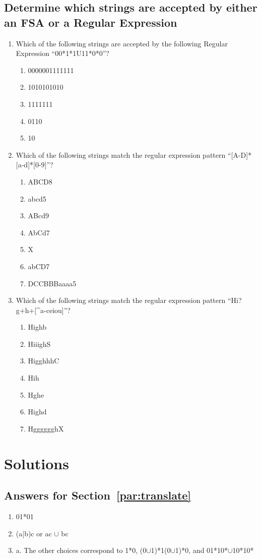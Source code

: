 \documentclass[10pt]{article}
\begin{document}
\subsection{Determine which strings are accepted by either an FSA or a Regular Expression}
\label{par:accepted}
\begin{enumerate}
\item Which of the following strings are accepted by the following Regular Expression     ``00*1*1U11*0*0''?
    \begin{enumerate}
    \item 0000001111111
    \item 1010101010
    \item 1111111
    \item 0110
    \item 10
    \end{enumerate}
\item Which of the following strings match the regular expression
pattern ``[A-D]*[a-d]*[0-9]''?
    \begin{enumerate}
    \item ABCD8
    \item abcd5
    \item ABcd9
    \item AbCd7
    \item X
    \item abCD7
    \item DCCBBBaaaa5
    \end{enumerate}
\item Which of the following strings match the regular expression
pattern ``Hi?g+h+[\string^a-ceiou]''?
    \begin{enumerate}
    \item Highb
    \item HiiighS
    \item HigghhhC
    \item Hih
    \item Hghe
    \item Highd
    \item HgggggghX
    \end{enumerate}
\end{enumerate}

\section{Solutions}

\subsection{Answers for Section~\ref{par:translate}}
\begin{enumerate}
\item 01*01
\item (a|b)c or ac $\cup$ bc
\item a. The other choices correspond to 1*0, (0$\cup$1)*1(0$\cup$1)*0, and 01*10*$\cup$10*10*
\end{enumerate}
\end{document}
